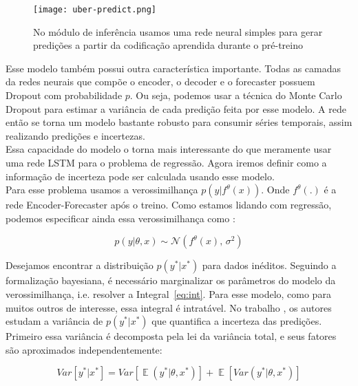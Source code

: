 \begin{figure}[H]
  \centering
  \texttt{[image: uber-predict.png]}
  \caption{No módulo de inferência usamos uma rede neural simples para gerar
    predições a partir da codificação aprendida durante o pré-treino \citep{ubertime}}
  \label{img:uber2}
\end{figure}




Esse modelo também possui outra característica importante. Todas as camadas da
redes neurais que compõe o encoder, o decoder e o forecaster possuem
Dropout com probabilidade $p$. Ou seja, podemos usar a técnica do Monte
Carlo Dropout para estimar a variância de cada predição feita por esse modelo. A
rede então se torna um modelo bastante robusto para consumir séries temporais,
assim realizando predições e incertezas.\\


Essa capacidade do modelo o torna mais interessante do que meramente usar uma
rede LSTM para o problema de regressão. Agora iremos definir como a informação
de incerteza pode ser calculada usando esse modelo. \\

Para esse problema usamos a verossimilhança $p(y |f^\theta(x))$.
Onde $f^\theta(.)$ é a rede Encoder-Forecaster após o treino.
Como estamos lidando com regressão, podemos especificar ainda essa verossimilhança
como \citep{ubertime}:  

\begin{equation}
  \label{eq:reg}
 p(y| \theta,x) \sim \mathcal{N}(f^{\theta}(x),\,\sigma^2)
\end{equation}

Desejamos encontrar a distribuição $p(y^*| x^*)$ para dados inéditos. Seguindo
a formalização bayesiana, é necessário marginalizar os parâmetros do modelo da
verossimilhança, i.e. resolver a Integral~\ref{eq:int}. Para esse modelo, como
para muitos outros de interesse, essa integral é intratável. No trabalho
\citep{ubertime}, os autores estudam a variância de $p(y^{*} | x^{*})$ que
quantifica a incerteza das predições. Primeiro essa variância é decomposta pela
lei da variância total, e seus fatores são aproximados independentemente: 

\begin{equation}
   Var[y^* | x^*] = Var[\mathop{\mathbb{E}}(y^* | \theta,x^*)] + \mathop{\mathbb{E}}[Var(y^* | \theta,x^*)]
   \label{eq:vartot}
 \end{equation}

